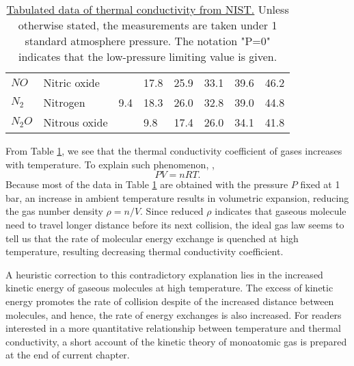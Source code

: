 \begin{table}[h]
\begin{center}
\begin{tabular}{llllllll}
\multicolumn{1}{l|}{$NO$}   & Nitric oxide                &            & 17.8       & 25.9       & 33.1      & 39.6      & 46.2      \\
\multicolumn{1}{l|}{$N_2$}  & Nitrogen                    & 9.4        & 18.3       & 26.0       & 32.8      & 39.0      & 44.8      \\
\multicolumn{1}{l|}{$N_2O$} & Nitrous oxide               &            & 9.8        & 17.4       & 26.0      & 34.1      & 41.8\\
\hline
\end{tabular}
\caption{\href{https://www.nist.gov/publications/thermal-conductivity-gases}{Tabulated data of thermal conductivity from NIST.} Unless otherwise stated, the measurements are taken under 1 standard atmosphere pressure. The notation "P=0" indicates that the low-pressure limiting value is given.}
\label{tab4-1}
\end{center}
\end{table}

From Table \ref{tab4-1}, we see that the thermal conductivity coefficient of gases increases with temperature. To explain such phenomenon, ,
\begin{equation}
    PV=nRT.
    \label{eq4-7}
\end{equation}
Because most of the data in Table \ref{tab4-1} are obtained with the pressure $P$ fixed at 1 bar, an increase in ambient temperature results in volumetric expansion, reducing the gas number density $\rho=n/V$. Since reduced $\rho$ indicates that gaseous molecule need to travel longer distance before its next collision, the ideal gas law seems to tell us that the rate of molecular energy exchange is quenched at high temperature, resulting decreasing thermal conductivity coefficient.

A heuristic correction to this contradictory explanation lies in the increased kinetic energy of gaseous molecules at high temperature. The excess of kinetic energy promotes the rate of collision despite of the increased distance between molecules, and hence, the rate of energy exchanges is also increased. For readers interested in a more quantitative relationship between temperature and thermal conductivity, a short account of the kinetic theory of monoatomic gas is prepared at the end of current chapter.

